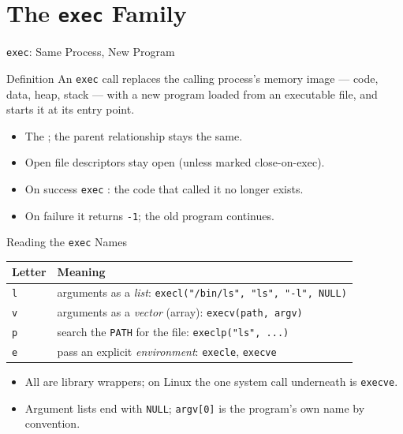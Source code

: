\documentclass[aspectratio=169]{beamer}
\begin{document}
\section{The \texttt{exec} Family}

\begin{frame}{\texttt{exec}: Same Process, New Program}
  \begin{block}{Definition}
    An \texttt{exec} call replaces the calling process's memory image ---
    code, data, heap, stack --- with a new program loaded from an executable
    file, and starts it at its entry point.
  \end{block}
  \begin{itemize}
    \item The ; the parent relationship stays the same.
    \item Open file descriptors stay open (unless marked close-on-exec).
    \item On success \texttt{exec} : the code that called
      it no longer exists.
    \item On failure it returns \texttt{-1}; the old program continues.
  \end{itemize}
\end{frame}

\begin{frame}{Reading the \texttt{exec} Names}
  \centering
  \renewcommand{\arraystretch}{1.3}
  \begin{tabular}{p{}p{}}
    \textbf{Letter} & \textbf{Meaning} \\
    \hline
    \texttt{l} & arguments as a \emph{list}: \texttt{execl("/bin/ls", "ls", "-l", NULL)} \\
    \texttt{v} & arguments as a \emph{vector} (array): \texttt{execv(path, argv)} \\
    \texttt{p} & search the \texttt{PATH} for the file: \texttt{execlp("ls", ...)} \\
    \texttt{e} & pass an explicit \emph{environment}: \texttt{execle}, \texttt{execve} \\
  \end{tabular}
  \vspace{0.3cm}
  \begin{itemize}
    \item All are library wrappers; on Linux the one system call underneath is
      \texttt{execve}.
    \item Argument lists end with \texttt{NULL}; \texttt{argv[0]} is the
      program's own name by convention.
  \end{itemize}
\end{frame}
\end{document}
